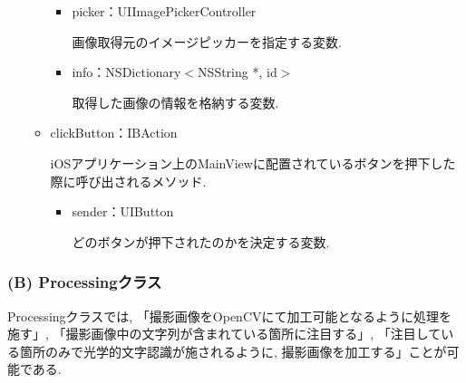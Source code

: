 \begin{itemize}
\begin{itemize}
\begin{itemize}
\item picker：UIImagePickerController

画像取得元のイメージピッカーを指定する変数.

\item info：NSDictionary$<$NSString *, id$>$

取得した画像の情報を格納する変数.
\end{itemize}

\item clickButton：IBAction

iOSアプリケーション上のMainViewに配置されているボタンを押下した際に呼び出されるメソッド.

\begin{itemize}
\item sender：UIButton

どのボタンが押下されたのかを決定する変数.
\end{itemize}

\end{itemize}

\end{itemize}

\subsubsection{(B) Processingクラス}
Processingクラスでは, 「撮影画像をOpenCVにて加工可能となるように処理を施す」, 「撮影画像中の文字列が含まれている箇所に注目する」, 「注目している箇所のみで光学的文字認識が施されるように, 撮影画像を加工する」ことが可能である.

